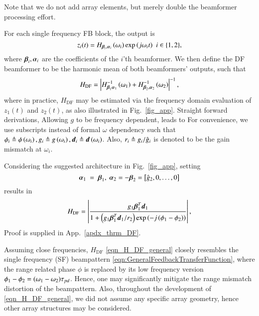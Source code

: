 Note that we do not add array elements, but merely double the beamformer processing effort. 
\par For each single frequency FB block, the output is
\[
z_{i}(t)=H_{\vBetaI{i},\vAlphaI{i}}\rBrace{\omega_{i}}\exp{\rBrace{j\omega_{i}t}}\ \ {i\in\cBrace{1,2}},
\]
where $\boldsymbol{\beta}_{i},\boldsymbol{\alpha}_{i}$ are the coefficients of the $i$'th beamformer. 
We then define the DF beamformer to be the harmonic mean of both beamformers' outputs, such that
\begin{equation}
    \label{eqn_HDF_def}
    H_{\text{DF}} = \abs{H^{-1}_{\vBetaI{1}\vAlphaI{1}}\rBrace{\omega_{1}}+H^{-1}_{\vBetaI{2},\vAlphaI{2}}\rBrace{\omega_{2}}}^{-1},
\end{equation}
where in practice, $H_{\text{DF}}$ may be estimated via the frequency domain evaluation of $z_1(t)$ and $z_2(t)$, as also illustrated in Fig.~\ref{fig_app}.
\ifdefined\useOmega
Straight forward derivations, Allowing $g$ to be frequency dependent, leads to
\else
For convenience, we use subscripts instead of formal $\omega$ dependency such that $\phi_{i}\triangleq\phi\left({\omega_{i}}\right), g_{i}\triangleq{}g\left({\omega_{i}}\right), \boldsymbol{d}_{i}\triangleq\boldsymbol{d}\left({\omega_{i}}\right)$.
Also, $r_i\triangleq{}g_{i}/\hat{g}_{i}$ is denoted to be the gain mismatch at $\omega_i$.


\begin{theorem}
\label{thrm_DF}
Considering the suggested architecture in Fig.~\ref{fig_app}, setting 
\begin{equation}\label{eqn_simpleBeta}
    \vAlphaI{1}~=~\vBetaI{1},\ \vAlphaI{2}=-\vBetaI{2}=\vBrace{\gIHat{2},0,\hdots,0}
\end{equation}
results in 
\begin{equation}
    H_{\text{DF}} = \lBrace{\frac{\gI{1}\vBetaTI{1}\vdI{1}}{1+
    \rBrace{\gI{1}\vBetaTI{1}\vdI{1}/r_{2}}\exp\rBrace{-j\rBrace{\phiI{1}-\phiI{2}}}
    }},
    \label{eqn_H_DF_general}
\end{equation}
Proof is supplied in App.~\ref{apdx_thrm_DF}. 
\end{theorem}
\par Assuming close frequencies, $H_{\text{DF}}$ \eqref{eqn_H_DF_general} closely resembles the single frequency (SF) beampattern \eqref{eqn:GeneralFeedbackTransferFunction}, where the range related phase $\phi$ is replaced by its low frequency version $\phi_{1}-\phi_{2}=(\omega_1-\omega_2)\tau_{pd}$. 
Hence, one may significantly mitigate the range mismatch distortion of the beampattern.
Also, throughout the development of \eqref{eqn_H_DF_general}, we did not assume any specific array geometry, hence other array structures may be considered.
